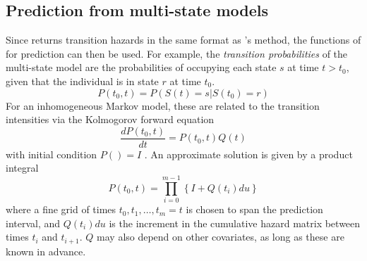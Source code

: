 \documentclass[nojss,nofooter]{jss}
\begin{document}
\subsection{Prediction from multi-state models}

Since  returns transition hazards in the same
format as 's  method, the functions of
 for prediction can then be used.  For example, the
\emph{transition probabilities} of the multi-state model are the
probabilities of occupying each state $s$ at time $t > t_0$, given
that the individual is in state $r$ at time $t_0$.
\[ P(t_0, t) = P(S(t) = s | S(t_0) = r) \]
For an inhomogeneous Markov model, these are related to the transition
intensities via the Kolmogorov forward equation
\[ \frac{d P(t_0,t)}{dt} = P(t_0,t) Q(t) \] with initial condition
$P() = I$ \citep{cox:miller}.  An approximate solution
\citep[e.g.][]{aalen:process} is given by a product integral
\[ P(t_0, t) = \prod_{i=0}^{m-1} \left\{ I + Q(t_i) du \right\} \]
where a fine grid of times $t_0,t_1,\ldots,t_m=t$ is chosen to span
the prediction interval, and $Q(t_i) du$ is the increment in the
cumulative hazard matrix between times $t_i$ and $t_{i+1}$.  $Q$ may
also depend on other covariates, as long as these are known in
advance.
\end{document}
